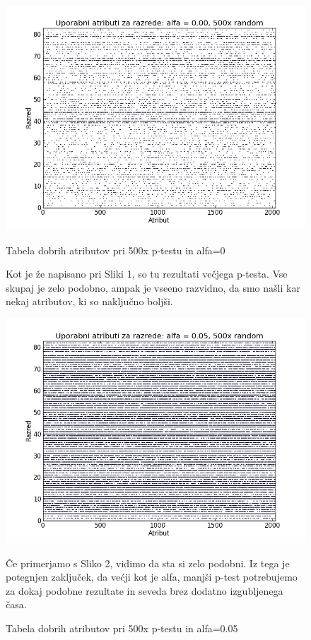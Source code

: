 \documentclass[a4paper,11pt]{article}
\begin{document}
\begin{figure}
\begin{center}
\includegraphics[scale=0.5]{5.png}
\caption{Tabela dobrih atributov pri 500x p-testu in alfa=0}
\end{center}
Kot je že napisano pri Sliki 1, so tu rezultati večjega p-testa. Vse skupaj je zelo podobno, ampak je vseeno razvidno, da smo našli kar nekaj atributov, ki so naključno boljši. 
\begin{center}
\includegraphics[scale=0.5]{6.png}
\caption{Tabela dobrih atributov pri 500x p-testu in alfa=0.05}
\end{center}
Če primerjamo s Sliko 2, vidimo da sta si zelo podobni. Iz tega je potegnjen zaključek, da većji kot je alfa, manjši p-test potrebujemo za dokaj podobne rezultate in seveda brez dodatno izgubljenega časa.
\end{figure}
\end{document}
